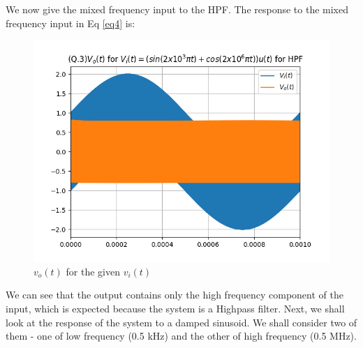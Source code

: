 \documentclass[11pt, a4paper]{article}
\begin{document}
We now give the mixed frequency input to the HPF. \newline
The response to the mixed frequency input in Eq \eqref{eq4} is:
\clearpage
    \begin{figure}[H]
        \centering
        \includegraphics[scale=0.6]{Figure_4.png}
        \caption{$v_o(t)$ for the given $v_i(t)$}
        \label{fig:Fig2}
    \end{figure}
We can see that the output contains only the high frequency component of the input, which is expected because the system is a Highpass filter.
    \newline\newline\newline
Next, we shall look at the response of the system to a damped sinusoid. We shall consider two of them - one of low frequency (0.5 kHz) and the other of high frequency (0.5 MHz).
\end{document}
